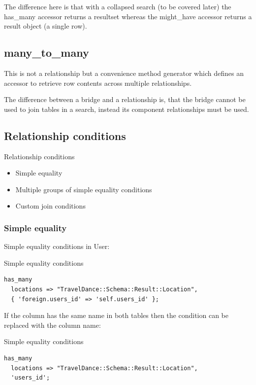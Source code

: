 The difference here is that with a collapsed search (to be covered later)
the has\_many accessor returns a resultset whereas the might\_have accessor
returns a result object (a single row).

\subsection{many\_to\_many}

This is not a relationship but a convenience method generator which defines an
accessor to retrieve row contents across multiple relationships.

The difference between a bridge and a relationship is, that the bridge
cannot be used to join tables in a search, instead its component
relationships must be used.

\subsection{Relationship conditions}

\begin{frame}{Relationship conditions}
\begin{itemize}
\item Simple equality
\item Multiple groups of simple equality conditions
\item Custom join conditions
\end{itemize}
\end{frame}

\subsubsection{Simple equality}

Simple equality conditions
in User:

\begin{frame}[fragile]{Simple equality conditions}
\begin{lstlisting}
has_many
  locations => "TravelDance::Schema::Result::Location",
  { 'foreign.users_id' => 'self.users_id' };
\end{lstlisting}
\end{frame}

If the column has the same name in both tables then the condition can be replaced with the column name:

\begin{frame}[fragile]{Simple equality conditions}
\begin{lstlisting}
has_many
  locations => "TravelDance::Schema::Result::Location",
  'users_id';
\end{lstlisting}
\end{frame}

